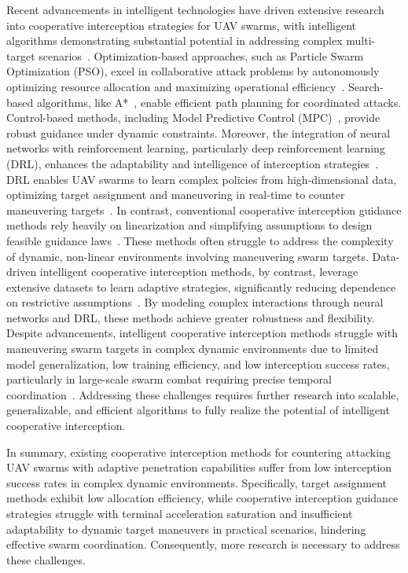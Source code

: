 \documentclass[lettersize,journal]{IEEEtran}
\newcommand{\hladd}[1]{{\color{blue}#1}}
\begin{document}
Recent advancements in intelligent technologies have driven extensive research into cooperative
interception strategies for UAV swarms, with intelligent algorithms demonstrating substantial
potential in addressing complex multi-target scenarios~\cite{chen2024enhanced,wu2020collaborative}.
Optimization-based approaches, such as Particle Swarm Optimization (PSO), excel in
collaborative attack problems by autonomously optimizing resource allocation and maximizing
operational efficiency~\cite{zhao2024hierarchical,wu2020collaborative}.
Search-based algorithms, like A*~\cite{liao2024research}, enable efficient path planning for
coordinated attacks.
Control-based methods, including Model Predictive Control
(MPC)~\cite{kim2024adaptive}, provide robust guidance under dynamic constraints.
Moreover, the integration of neural networks with reinforcement learning, particularly deep
reinforcement learning (DRL), enhances the adaptability and intelligence of interception
strategies~\cite{luo2022uav,zhan2022multiple,wang2021uav}.
DRL enables UAV swarms to learn complex policies from high-dimensional data, optimizing target
assignment and maneuvering in real-time to counter maneuvering targets~\cite{sun2024memory}.
In contrast, conventional cooperative interception guidance methods rely heavily on
linearization and simplifying assumptions to design feasible guidance laws~\cite{zhao2025global}.
These methods often struggle to address the complexity of dynamic, non-linear environments
involving maneuvering swarm targets.
Data-driven intelligent cooperative interception methods, by contrast, leverage extensive
datasets to learn adaptive strategies, significantly reducing dependence on restrictive
assumptions~\cite{fainkich2025cooperative}.
By modeling complex interactions through neural networks and DRL, these methods achieve greater
robustness and flexibility.
Despite advancements, intelligent cooperative interception methods struggle with maneuvering
swarm targets in complex dynamic environments due to limited model generalization, low training
efficiency, and low interception success rates, particularly in large-scale swarm combat
requiring precise temporal coordination~\cite{horyna2023decentralized}.
Addressing these challenges requires further research into scalable, generalizable, and
efficient algorithms to fully realize the potential of intelligent cooperative interception.

In summary, existing cooperative interception methods for countering attacking UAV swarms with
adaptive penetration capabilities suffer from low interception success rates in complex dynamic
environments.
Specifically, target assignment methods exhibit low allocation efficiency, while cooperative
interception guidance strategies struggle with \hladd{terminal acceleration saturation} and insufficient
adaptability to dynamic target maneuvers in practical scenarios, hindering effective swarm
coordination.
Consequently, more research is necessary to address these challenges.
\end{document}
